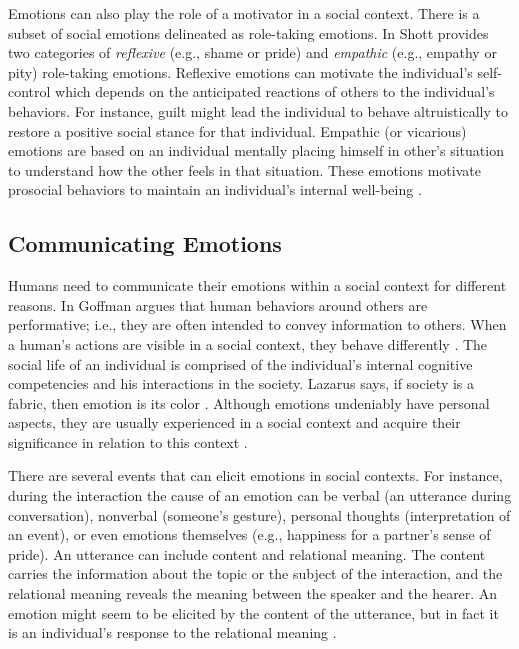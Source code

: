 \documentclass[12pt]{report}
\begin{document}
Emotions can also play the role of a motivator in a social context. There is a
subset of social emotions delineated as role-taking emotions. In
\cite{shott:emotion-social-life} Shott provides two categories of
\textit{reflexive} (e.g., shame or pride) and \textit{empathic} (e.g., empathy
or pity) role-taking emotions. Reflexive emotions can motivate the individual's
self-control which depends on the anticipated reactions of others to the
individual's behaviors. For instance, guilt might lead the individual to behave
altruistically to restore a positive social stance for that individual. Empathic
(or vicarious) emotions are based on an individual mentally placing himself in
other's situation to understand how the other feels in that situation. These
emotions motivate prosocial behaviors to maintain an individual's internal
well-being \cite{thoits:socialogy-emotion}.

\subsection{Communicating Emotions}
\label{section-emotion-comm}

Humans need to communicate their emotions within a social context for different
reasons. In \cite{goffman:self-presentation} Goffman argues that human behaviors
around others are performative; i.e., they are often intended to convey
information to others. When a human's actions are visible in a social context,
they behave differently \cite{zajonc:social-facilitation}. The social life of an
individual is comprised of the individual's internal cognitive competencies and
his interactions in the society. Lazarus says, if society is a fabric, then
emotion is its color \cite{lazarus:emotion-adaptation}. Although emotions
undeniably have personal aspects, they are usually experienced in a social
context and acquire their significance in relation to this context
\cite{parkinson:emotion-social-interaction}.

There are several events that can elicit emotions in social contexts. For
instance, during the interaction the cause of an emotion can be verbal (an
utterance during conversation), nonverbal (someone's gesture), personal thoughts
(interpretation of an event), or even emotions themselves (e.g., happiness for a
partner's sense of pride). An utterance can include content and relational
meaning. The content carries the information about the topic or the subject of
the interaction, and the relational meaning reveals the meaning between the
speaker and the hearer. An emotion might seem to be elicited by the content of
the utterance, but in fact it is an individual's response to the relational
meaning \cite{planalp:communicating-emotion}. 
\end{document}

